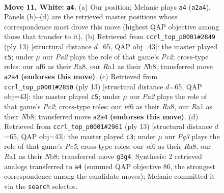 \documentclass[11pt]{article}
\begin{document}
\clearpage

\begin{figure}[p]\centering
\begin{subfigure}{0.46\textwidth}\centering
\resizebox{\linewidth}{!}{%
\newchessgame
\chessboard[
  setfen={r1br2k1/ppq1bppp/n1p1pn2/8/2NP4/1P3PP1/P3P1BP/RNBQ1RK1 w - - 1 11},
  showmover=false,
  pgfstyle=straightmove, color=movearrow, markmove={a2-a4}
]}
\caption{}
\end{subfigure}\hfill
\begin{subfigure}{0.46\textwidth}\centering
\resizebox{\linewidth}{!}{%
\newchessgame
\chessboard[
  setfen={rnbq1rk1/ppp1ppbp/5np1/8/2pP4/N4NP1/PP2PPBP/R1BQ1RK1 b - - 1 7},
  showmover=false,
  pgfstyle=straightmove, color=movearrow, markmove={c7-c5}
]}
\caption{}
\end{subfigure}
\\[4pt]
\begin{subfigure}{0.46\textwidth}\centering
\resizebox{\linewidth}{!}{%
\newchessgame
\chessboard[
  setfen={rnbq1rk1/ppp1ppbp/5np1/8/2pP4/N4NP1/PP2PPBP/R1BQ1RK1 b - - 1 7},
  showmover=false,
  pgfstyle=straightmove, color=movearrow, markmove={c7-c5}
]}
\caption{}
\end{subfigure}\hfill
\begin{subfigure}{0.46\textwidth}\centering
\resizebox{\linewidth}{!}{%
\newchessgame
\chessboard[
  setfen={rnbq1rk1/ppp1ppbp/5np1/8/2pP4/N4NP1/PP2PPBP/R1BQ1RK1 b - - 1 7},
  showmover=false,
  pgfstyle=straightmove, color=movearrow, markmove={c4-c3}
]}
\caption{}
\end{subfigure}
\caption{\textbf{Move 11, White: \texttt{a4}.} (a) Our position; Melanie plays \texttt{a4} (\texttt{a2a4}). Panels (b)--(d) are the retrieved master positions whose correspondence most drove this move (highest QAP objective among those that transfer to it). (b) Retrieved from \texttt{ccrl\_top\_p0001\#2849} (ply 13) [structural distance $d$=65, QAP obj=43]: the master played \texttt{c5}; under $\mu$ our \emph{Pa2} plays the role of that game's \emph{Pc2}; cross-type roles: our \emph{n}f6 as their \emph{R}a8, our \emph{R}a1 as their \emph{N}b8; transferred move \texttt{a2a4} \textbf{(endorses this move)}. (c) Retrieved from \texttt{ccrl\_top\_p0001\#2850} (ply 13) [structural distance $d$=65, QAP obj=43]: the master played \texttt{c5}; under $\mu$ our \emph{Pa2} plays the role of that game's \emph{Pc2}; cross-type roles: our \emph{n}f6 as their \emph{R}a8, our \emph{R}a1 as their \emph{N}b8; transferred move \texttt{a2a4} \textbf{(endorses this move)}. (d) Retrieved from \texttt{ccrl\_top\_p0001\#2961} (ply 13) [structural distance $d$=65, QAP obj=43]: the master played \texttt{c3}; under $\mu$ our \emph{Pg3} plays the role of that game's \emph{Pc5}; cross-type roles: our \emph{n}f6 as their \emph{R}a8, our \emph{R}a1 as their \emph{N}b8; transferred move \texttt{g3g4}. Synthesis: 2 retrieved analogs transferred to \texttt{a4} (summed QAP objective 86, the strongest correspondence among the candidate moves); Melanie committed it via the \texttt{search} selector.}
\label{fig:thought-m20}
\end{figure}
\end{document}
